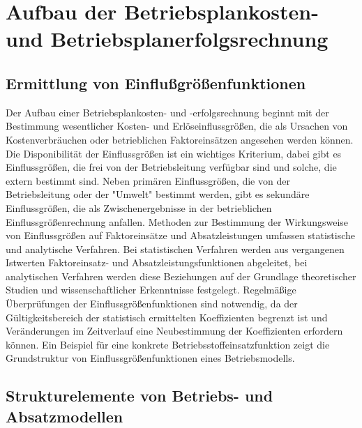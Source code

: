 \section{Aufbau der Betriebsplankosten- und Betriebsplanerfolgsrechnung}

\subsection{Ermittlung von Einflu{\ss}grö{\ss}enfunktionen}

Der Aufbau einer Betriebsplankosten- und -erfolgsrechnung beginnt mit der Bestimmung wesentlicher Kosten- und Erlöseinflussgrö{\ss}en, die als Ursachen von Kostenverbräuchen oder betrieblichen Faktoreinsätzen angesehen werden können. Die Disponibilität der Einflussgrö{\ss}en ist ein wichtiges Kriterium, dabei gibt es Einflussgrö{\ss}en, die frei von der Betriebsleitung verfügbar sind und solche, die extern bestimmt sind. Neben primären Einflussgrö{\ss}en, die von der Betriebsleitung oder der "Umwelt" bestimmt werden, gibt es sekundäre Einflussgrö{\ss}en, die als Zwischenergebnisse in der betrieblichen Einflussgrö{\ss}enrechnung anfallen. Methoden zur Bestimmung der Wirkungsweise von Einflussgrö{\ss}en auf Faktoreinsätze und Absatzleistungen umfassen statistische und analytische Verfahren. Bei statistischen Verfahren werden aus vergangenen Istwerten Faktoreinsatz- und Absatzleistungsfunktionen abgeleitet, bei analytischen Verfahren werden diese Beziehungen auf der Grundlage theoretischer Studien und wissenschaftlicher Erkenntnisse festgelegt. Regelmä{\ss}ige Überprüfungen der Einflussgrö{\ss}enfunktionen sind notwendig, da der Gültigkeitsbereich der statistisch ermittelten Koeffizienten begrenzt ist und Veränderungen im Zeitverlauf eine Neubestimmung der Koeffizienten erfordern können. Ein Beispiel für eine konkrete Betriebsstoffeinsatzfunktion zeigt die Grundstruktur von Einflussgrö{\ss}enfunktionen eines Betriebsmodells.

\subsection{Strukturelemente von Betriebs- und Absatzmodellen}


